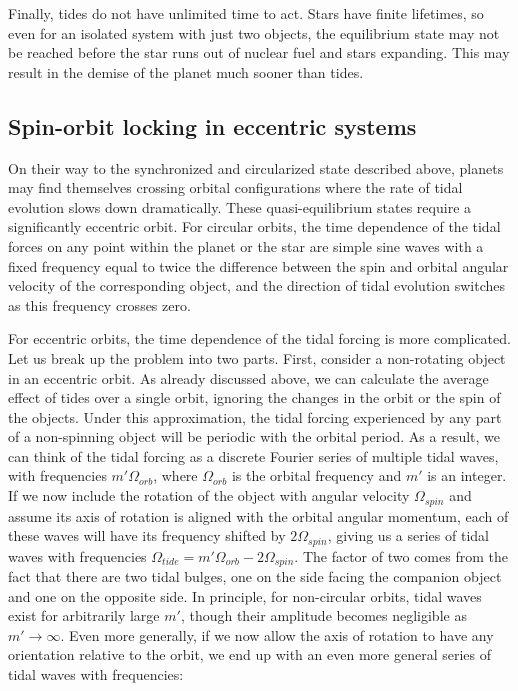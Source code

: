 Finally, tides do not have unlimited time to act. Stars have finite lifetimes,
so even for an isolated system with just two objects, the equilibrium state may
not be reached before the star runs out of nuclear fuel and stars expanding.
This may result in the demise of the planet much sooner than tides.

\subsection{Spin-orbit locking in eccentric systems}

On their way to the synchronized and circularized state described above, planets
may find themselves crossing orbital configurations where the rate of tidal
evolution slows down dramatically. These quasi-equilibrium states require a
significantly eccentric orbit. For circular orbits, the time dependence of the
tidal forces on any point within the planet or the star are simple sine waves
with a fixed frequency equal to twice the difference between the spin and
orbital angular velocity of the corresponding object, and the direction of tidal
evolution switches as this frequency crosses zero.

For eccentric orbits, the time dependence of the tidal forcing is more
complicated. Let us break up the problem into two parts. First, consider a
non-rotating object in an eccentric orbit. As already discussed above, we can
calculate the average effect of tides over a single orbit, ignoring the changes
in the orbit or the spin of the objects. Under this approximation, the tidal
forcing experienced by any part of a non-spinning object will be periodic with
the orbital period. As a result, we can think of the tidal forcing as a discrete
Fourier series of multiple tidal waves, with frequencies $m' \Omega_{orb}$,
where $\Omega_{orb}$ is the orbital frequency and $m'$ is an integer. If we now
include the rotation of the object with angular velocity $\Omega_{spin}$ and
assume its axis of rotation is aligned with the orbital angular momentum, each
of these waves will have its frequency shifted by $2\Omega_{spin}$, giving us a
series of tidal waves with frequencies $\Omega_{tide} = m' \Omega_{orb} - 2
\Omega_{spin}$. The factor of two comes from the fact that there are two tidal
bulges, one on the side facing the companion object and one on the opposite
side. In principle, for non-circular orbits, tidal waves exist for arbitrarily
large $m'$, though their amplitude becomes negligible as $m'\rightarrow\infty$.
Even more generally, if we now allow the axis of rotation to have any
orientation relative to the orbit, we end up with an even more general series of
tidal waves with frequencies:

